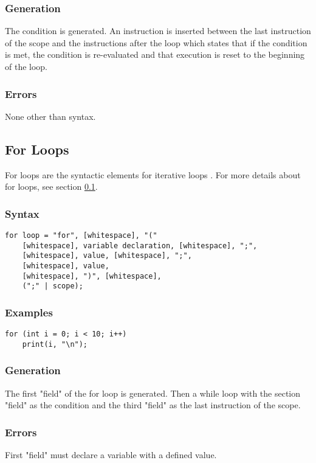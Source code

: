 \documentclass[10pt,a4paper]{article}
\begin{document}
\subsubsection{Generation}
The condition is generated. An instruction is inserted between the last instruction of the scope and the instructions after the loop which states that if the condition is met, the condition is re-evaluated and that execution is reset to the beginning of the loop.

\subsubsection{Errors}
None other than syntax.

\newpage





\subsection{For Loops}
\label{sec:ForLoops}
For loops are the syntactic elements for iterative loops . For more details about for loops, see section \ref{sec:ForLoops}.

\subsubsection{Syntax}
\begin{verbatim}
for loop = "for", [whitespace], "("
    [whitespace], variable declaration, [whitespace], ";",
    [whitespace], value, [whitespace], ";",
    [whitespace], value,
    [whitespace], ")", [whitespace],
    (";" | scope);
\end{verbatim}

\subsubsection{Examples}
\begin{verbatim}
for (int i = 0; i < 10; i++)
    print(i, "\n");
\end{verbatim}

\subsubsection{Generation}
The first "field" of the for loop is generated. Then a while loop with the section "field" as the condition and the third "field" as the last instruction of the scope.

\subsubsection{Errors}
First "field" must declare a variable with a defined value.
\end{document}
